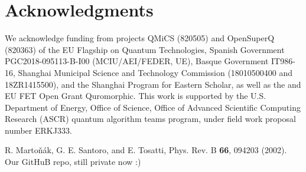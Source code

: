 \documentclass[aps,pra,twocolumn,superscriptaddress]{revtex4-2}
\begin{document}
\section{Acknowledgments}
We acknowledge funding from projects QMiCS (820505) and OpenSuperQ (820363) of the EU Flagship on Quantum Technologies,  Spanish Government PGC2018-095113-B-I00 (MCIU/AEI/FEDER, UE), Basque Government IT986-16, Shanghai Municipal Science and Technology Commission (18010500400 and 18ZR1415500), and the Shanghai Program for Eastern Scholar, as well as the and EU FET Open Grant Quromorphic. This work is supported by the U.S. Department of Energy, Office of Science, Office of Advanced Scientific Computing Research (ASCR) quantum algorithm teams program, under field work proposal number ERKJ333.



\begin{thebibliography}{99}

 R. Marto\v{n}\'ak, G. E. Santoro, and E. Tosatti, Phys. Rev. B \textbf{66}, 094203 (2002).
Our GitHuB repo, still private now :)


\end{thebibliography}

\appendix
\end{document}
